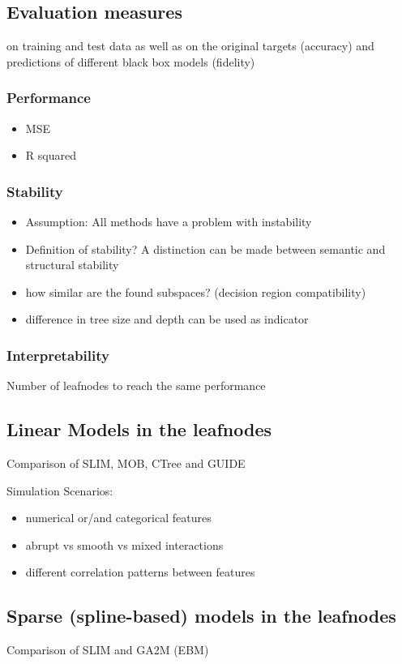 \subsection{Evaluation measures}
on training and test data as well as on the original targets (accuracy) and predictions of different black box models (fidelity)
\subsubsection{Performance}
\begin{itemize}
    \item MSE
    \item R squared
\end{itemize}

\subsubsection{Stability}
\begin{itemize}
    \item Assumption: All methods have a problem with instability \citep{Fokkema.2020}
    \item Definition of stability? A distinction can be made between semantic and structural stability \citep{Wang.2018}
    \item how similar are the found subspaces? (decision region compatibility) \citep{Wang.2018}

    \item difference in tree size and depth can be used as indicator \citep{Wang.2018}


\end{itemize}






\subsubsection{Interpretability}
Number of leafnodes to reach the same performance

\subsection{Linear Models in the leafnodes}
Comparison of SLIM, MOB, CTree and GUIDE

Simulation Scenarios:
\begin{itemize}
    \item numerical or/and categorical features
    \item abrupt vs smooth vs mixed interactions
    \item different correlation patterns between features
\end{itemize}


\subsection{Sparse (spline-based) models in the leafnodes}
Comparison of SLIM and GA2M (EBM)
